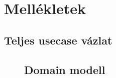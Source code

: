 \documentclass[a4paper,12pt,oneside]{report}
\begin{document}
\section{Mellékletek}




\subsection{Teljes usecase vázlat}
\label{fig:bimg_usecase_schema_full}


\begin{landscape}
\begin{figure}[h]
  \subsection{Domain modell}

\end{figure}
\end{landscape}
\end{document}
